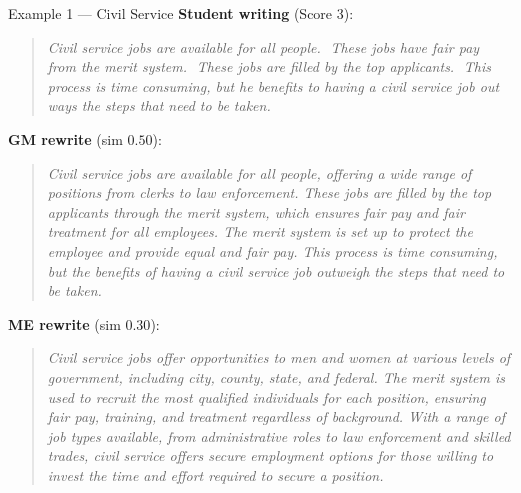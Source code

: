 \begin{examplebox}{Example 1 --- Civil Service}
\textbf{Student writing} (Score 3):

\begin{quote}\itshape
Civil service jobs are available for all people.\,\, These jobs have fair pay from the merit system.\,\, These jobs are filled by the top applicants.\,\, This process is time consuming, but he benefits to having a civil service job out ways the steps that need to be taken.
\end{quote}

\textbf{GM rewrite} (sim $0.50$):

\begin{quote}\itshape
Civil service jobs are available for all people, offering a wide range of positions from clerks to law enforcement. These jobs are filled by the top applicants through the merit system, which ensures fair pay and fair treatment for all employees. The merit system is set up to protect the employee and provide equal and fair pay. This process is time consuming, but the benefits of having a civil service job outweigh the steps that need to be taken.
\end{quote}

\textbf{ME rewrite} (sim $0.30$):

\begin{quote}\itshape
Civil service jobs offer opportunities to men and women at various levels of government, including city, county, state, and federal. The merit system is used to recruit the most qualified individuals for each position, ensuring fair pay, training, and treatment regardless of background. With a range of job types available, from administrative roles to law enforcement and skilled trades, civil service offers secure employment options for those willing to invest the time and effort required to secure a position.
\end{quote}
\end{examplebox}
\label{ex:civil-service}
